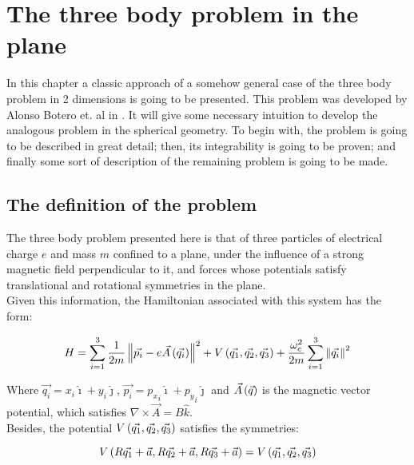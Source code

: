 \chapter{The three body problem in the plane}

In this chapter a classic approach of a somehow general case of the three body problem in 2 dimensions is going to be presented. This problem was developed by Alonso Botero et. al in \cite{alonso}. It will give some necessary intuition to develop the analogous problem in the spherical geometry. To begin with, the problem is going to be described in great detail; then, its integrability is going to be proven; and finally some sort of description of the remaining problem is going to be made.\\

\section{The definition of the problem}

The three body problem presented here is that of three particles of electrical charge $e$ and mass $m$ confined to a plane, under the influence of a strong magnetic field perpendicular to it, and forces whose potentials satisfy translational and rotational symmetries in the plane.\\

Given this information, the Hamiltonian associated with this system has the form:

\begin{equation}
H = \sum_{i=1}^{3} \frac{1}{2m} \left\lVert  \vec{p_i} - 
e\vec{ A } \left( \vec{q_i} \right) \right\rVert^2
+ V \left(  \vec{q_1},\vec{q_2},\vec{q_3}  \right)
+\frac{\omega_c^2}{2m}\sum_{i=1}^{3} \left\lVert \vec{q_i} \right\rVert^2
\label{eq:ham2d}
\end{equation}

Where $\vec{q_i} = x_i \hat{\imath} + y_i \hat{\jmath}$, $\vec{p_i} = {p_x}_i\hat{\imath} + {p_y}_i\hat{\jmath}$ and $\vec{A}\left( \vec{q} \right)$ is the magnetic vector potential, which satisfies $\nabla \times \vec{A} = B\hat{k}$.\\

Besides, the potential $V \left(  \vec{q_1},\vec{q_2},\vec{q_3}  \right)$ satisfies the symmetries:

\begin{equation}
V \left(  R\vec{q_1}+\vec{a},R\vec{q_2}+\vec{a},R\vec{q_3}+\vec{a}   \right)= V \left(  \vec{q_1},\vec{q_2},\vec{q_3}  \right)
\label{eq:vsym}
\end{equation}

